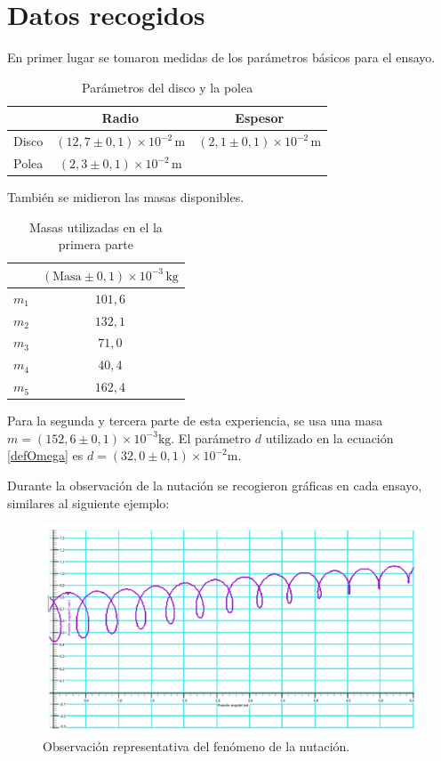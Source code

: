 \documentclass[a4paper]{article}
\begin{document}
\section{Datos recogidos}
En primer lugar se tomaron medidas de los parámetros básicos para el ensayo. 
\begin{table}[H]
\begin{center}
\begin{tabular}{|c|c|c|}
\cline{2-3}
\multicolumn{1}{c|}{}& Radio & Espesor\\
\hline
Disco&$\left(12,7\pm 0,1\right)\times 10^{-2}\,\text{m}$&$\left(2,1\pm 0,1\right)\times 10^{-2}\,\text{m}$\\
\hline
Polea&$\left(2,3\pm 0,1\right)\times 10^{-2}\,\text{m}$&\multicolumn{1}{c}{}\\
\cline{1-2}
\end{tabular}
\caption{Parámetros del disco y la polea}
\end{center}
\end{table}
También se midieron las masas disponibles.
\begin{table}[H]
\begin{center}
\begin{tabular}{|c|c|}
\cline{2-2}
\multicolumn{1}{c|}{}&$\left( \text{Masa}\pm 0,1\right) \times 10^{-3}\,\text{kg}$\\ \hline
$m_1$&$101,6$\\ \hline
$m_2$&$132,1$\\ \hline
$m_3$&$71,0$\\ \hline
$m_4$&$40,4$\\ \hline
$m_5$&$162,4$\\ \hline
\end{tabular}
\caption{Masas utilizadas en el la primera parte}
\end{center}
\end{table}
Para la segunda y tercera parte de esta experiencia, se usa una masa $m=\left(152,6\pm 0,1\right)\times 10^{-3} \text{kg}$. El parámetro $d$ utilizado en la ecuación \ref{defOmega} es $d=\left(32,0\pm 0,1\right)\times 10^{-2} \text{m}$. 

Durante la observación de la nutación se recogieron gráficas en cada ensayo, similares al siguiente ejemplo:
\begin{figure}[H]
\begin{center}
\includegraphics[width=12 cm]{nuta1.png}
\caption{Observación representativa del fenómeno de la nutación.}
\end{center}
\end{figure}
\end{document}
